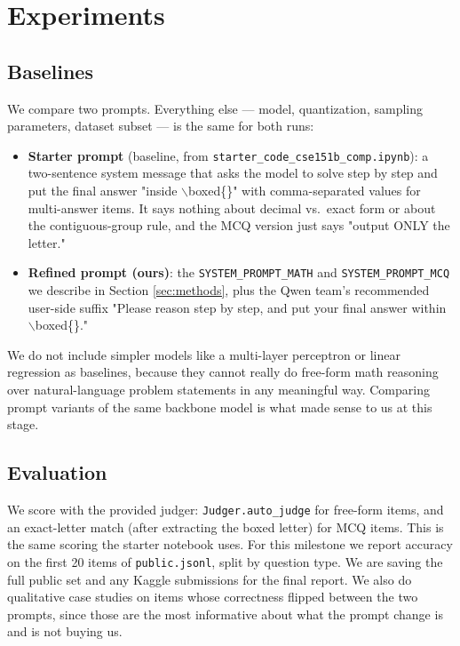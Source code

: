 \documentclass{article}
\begin{document}
\section{Experiments}
\label{sec:experiments}

\subsection{Baselines}
\label{sec:baselines}
We compare two prompts. Everything else --- model, quantization,
sampling parameters, dataset subset --- is the same for both runs:
\begin{itemize}
    \item \textbf{Starter prompt} (baseline, from
    \texttt{starter\_code\_cse151b\_comp.ipynb}): a two-sentence
    system message that asks the model to solve step by step and put
    the final answer "inside $\backslash$boxed\{\}" with
    comma-separated values for multi-answer items. It says nothing
    about decimal vs.\ exact form or about the contiguous-group rule,
    and the MCQ version just says "output ONLY the letter."
    \item \textbf{Refined prompt (ours)}: the
    \texttt{SYSTEM\_PROMPT\_MATH} and \texttt{SYSTEM\_PROMPT\_MCQ}
    we describe in Section \ref{sec:methods}, plus the Qwen team's
    recommended user-side suffix "Please reason step by step, and
    put your final answer within $\backslash$boxed\{\}."
\end{itemize}
We do not include simpler models like a multi-layer perceptron or
linear regression as baselines, because they cannot really do
free-form math reasoning over natural-language problem statements
in any meaningful way. Comparing prompt variants of the same backbone
model is what made sense to us at this stage.

\subsection{Evaluation}
\label{sec:evaluation}
We score with the provided judger: \texttt{Judger.auto\_judge} for
free-form items, and an exact-letter match (after extracting the
boxed letter) for MCQ items. This is the same scoring the starter
notebook uses. For this milestone we report accuracy on the first
20 items of \texttt{public.jsonl}, split by question type. We are
saving the full public set and any Kaggle submissions for the final
report. We also do qualitative case studies on items whose
correctness flipped between the two prompts, since those are the
most informative about what the prompt change is and is not buying
us.
\end{document}

